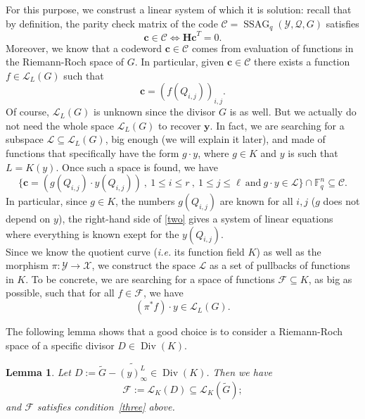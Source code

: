 \documentclass[10pt]{article}
\newtheorem{lem1}[thm]{Lemma}
\theoremstyle{definition}
\theoremstyle{definition}
\theoremstyle{definition}
\newcommand{\cd}{\cdot}
\newcommand{\C}{\mathcal{C}}
\newcommand{\Fq}{\mathbb{F}_q}
\newcommand{\su}{\subseteq}
\newcommand{\X}{\mathcal{X}}
\newcommand{\Y}{\mathcal{Y}}
\newcommand{\QR}{\mathcal{Q}}
\newcommand{\Div}{\operatorname{Div}}
\newcommand{\ssag}{\operatorname{SSAG}}
\newcommand{\calL}{\mathcal{L}}
\begin{document}
For this purpose, we construst a linear system of which it is solution: recall that by definition, the parity check matrix of the code $\mathcal{C}=\ssag_q(\Y,\QR,G)$ satisfies
\begin{equation} \label{two}
\mathbf{c} \in \mathcal{C} \iff \mathbf{Hc}^T = 0.
\end{equation}
Moreover, we know that a codeword $\mathbf{c} \in \mathcal{C}$ comes from evaluation of functions in the Riemann-Roch space of $G$. In particular, given $\mathbf{c} \in \C$ there exists a function $f \in \calL_L(G)$ such that  
\[\mathbf{c} = (f(Q_{i,j}))_{i,j}.\]
Of course, $\calL_L(G)$ is unknown since the divisor $G$ is as well. But we actually do not need the whole space $\calL_L(G)$ to recover $\mathbf{y}$. In fact, we are searching for a subspace $\mathcal{L} \su \calL_L(G)$, big enough (we will explain it later), and made of functions that specifically have the form $g \cd y$, where $g \in K$ and $y$ is such that $L=K(y)$. Once such a space is found, we have 
\[\{\mathbf{c}= (g(Q_{i,j}) \cd y(Q_{i,j})) \ , \ 1 \leq i \leq r \ , \ 1 \leq j \leq \ell \ \textrm{and} \ g\cd y \in \mathcal{L}\} \cap \Fq^n \su \mathcal{C}.\] 
In particular, since $g \in K$, the numbers $g(Q_{i,j})$ are known for all $i,j$ ($g$ does not depend on $y$), the right-hand side of \eqref{two} gives a system of linear equations where everything is known exept for the $y(Q_{i,j})$. \\
Since we know the quotient curve (\textit{i.e.} its function field $K$) as well as the morphism $\pi : \Y \rightarrow \X$, we construct the space $\mathcal{L}$ as a set of pullbacks of functions in $K$. To be concrete, we are searching for a space of functions $\mathcal{F} \su K$, as big as possible, such that for all $f \in \mathcal{F}$, we have
\begin{equation} \label{three}
(\pi^*f) \cd y \in \calL_L(G). 
\end{equation}

The following lemma shows that a good choice is to consider a Riemann-Roch space of a specific divisor $D \in \Div(K)$.   

\begin{lem1} \label{constructionD} Let $D := \widetilde{G}-\widetilde{(y)^L_{\infty}} \in \Div(K)$. Then we have
\[\mathcal{F} := \calL_K(D) \su \calL_K(\tilde{G});\]
and $\mathcal{F}$ satisfies condition~\eqref{three} above.
\end{lem1}
\end{document}
